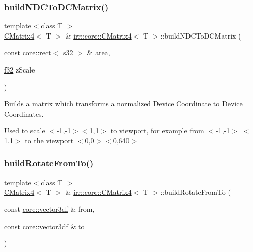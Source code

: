 \subsubsection{\texorpdfstring{build\+N\+D\+C\+To\+D\+C\+Matrix()}{buildNDCToDCMatrix()}}
{\footnotesize\ttfamily template$<$class T $>$ \\
\hyperlink{classirr_1_1core_1_1CMatrix4}{C\+Matrix4}$<$ T $>$ \& \hyperlink{classirr_1_1core_1_1CMatrix4}{irr\+::core\+::\+C\+Matrix4}$<$ T $>$\+::build\+N\+D\+C\+To\+D\+C\+Matrix (\begin{DoxyParamCaption}\item[{const \hyperlink{classirr_1_1core_1_1rect}{core\+::rect}$<$ \hyperlink{namespaceirr_ac66849b7a6ed16e30ebede579f9b47c6}{s32} $>$ \&}]{area,  }\item[{\hyperlink{namespaceirr_a0277be98d67dc26ff93b1a6a1d086b07}{f32}}]{z\+Scale }\end{DoxyParamCaption})\hspace{0.3cm}{\ttfamily [inline]}}



Builds a matrix which transforms a normalized Device Coordinate to Device Coordinates. 

Used to scale $<$-\/1,-\/1$>$$<$1,1$>$ to viewport, for example from $<$-\/1,-\/1$>$ $<$1,1$>$ to the viewport $<$0,0$>$$<$0,640$>$ \mbox{\label{classirr_1_1core_1_1CMatrix4_a4802c6a89ad813e2919f68f512fb320f}} 
\subsubsection{\texorpdfstring{build\+Rotate\+From\+To()}{buildRotateFromTo()}}
{\footnotesize\ttfamily template$<$class T $>$ \\
\hyperlink{classirr_1_1core_1_1CMatrix4}{C\+Matrix4}$<$ T $>$ \& \hyperlink{classirr_1_1core_1_1CMatrix4}{irr\+::core\+::\+C\+Matrix4}$<$ T $>$\+::build\+Rotate\+From\+To (\begin{DoxyParamCaption}\item[{const \hyperlink{namespaceirr_1_1core_a06f169d08b5c429f5575acb7edbad811}{core\+::vector3df} \&}]{from,  }\item[{const \hyperlink{namespaceirr_1_1core_a06f169d08b5c429f5575acb7edbad811}{core\+::vector3df} \&}]{to }\end{DoxyParamCaption})\hspace{0.3cm}{\ttfamily [inline]}}



